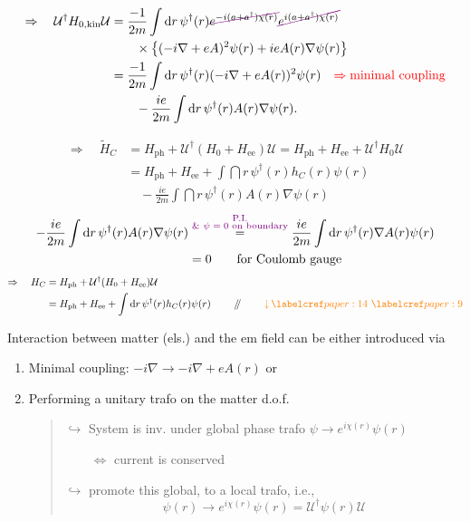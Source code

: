 \begin{align*}
\Rightarrow\quad \mathcal U^\dagger H_{0,\mathrm{kin}}\mathcal U
  &=\frac{-1}{2m}\int \dint r\,\psi^\dagger(r)
       \crossout{e^{-i(a+a^\dagger)\chi(r)}}\crossout{e^{i(a+a^\dagger)\chi(r)}}\\
  &\qquad{}\times
    \bigl\{(-i\nabla+eA)^2\psi(r)+ieA(r)\nabla\psi(r)\bigr\}\\
  &=\frac{-1}{2m}\int \dint r\,\psi^\dagger(r)(-i\nabla+eA(r))^2\psi(r)
      \quad \textcolor{red}{\Rightarrow \text{minimal coupling}}\\
  &\qquad{}-\frac{ie}{2m}\int \dint r\,\psi^\dagger(r)A(r)\nabla\psi(r).
\end{align*}

\begin{align*}
\Rightarrow\quad\widetilde H_C
 &=H_{\mathrm{ph}}+\mathcal U^\dagger(H_0+H_{\mathrm{ee}})\mathcal U
   =H_{\mathrm{ph}}+H_{\mathrm{ee}}+\mathcal U^\dagger H_0\mathcal U\\
 &=H_{\mathrm{ph}}+H_{\mathrm{ee}}+\int \dint r\,
      \psi^\dagger(r)h_C(r)\psi(r)\\
 &\quad -\frac{ie}{2m}\int \dint r\,\psi^\dagger(r)A(r)\nabla\psi(r)
\end{align*}
\begin{align*}
-\frac{ie}{2m}\int \mathop{}\!\mathrm{d} r\,\psi^\dagger(r)A(r)\nabla\psi(r)
 &\overset{\textcolor{violet}{\substack{\text{P.I.}\\
         \text{\& \(\psi=0\) on boundary}}}}{=}
    \frac{ie}{2m}\int \mathop{}\!\mathrm{d} r\,\psi^\dagger(r)\nabla A(r)\psi(r)\\
 &=0\qquad \text{for Coulomb gauge}
\end{align*}
\begin{align*}
\Rightarrow\quad H_C
 &=H_{\mathrm{ph}}+\mathcal U^\dagger(H_0+H_{\mathrm{ee}})\mathcal U\\
 &=H_{\mathrm{ph}}+H_{\mathrm{ee}}+\int \dint r\,\psi^\dagger(r)h_C(r)\psi(r)
 \qquad\done\qquad\textcolor{orange}{\downarrow}\,
   \paperref{paper:14}\ \paperref{paper:9}
\end{align*}

 Interaction between matter (els.) and the em field
can be either introduced via
\begin{enumerate}
\renewcommand{\labelenumi}{\roman{enumi})}
\item Minimal coupling: \(-i\nabla\to-i\nabla+eA(r)\) or
\item Performing a unitary trafo on the matter d.o.f.
\begin{quote}
\(\hookrightarrow\) System is inv. under global phase trafo
\(\psi\to e^{i\chi(r)}\psi(r)\)

\(\qquad\Leftrightarrow\) current is conserved

\(\hookrightarrow\) promote this global, to a local trafo, i.e.,
\[
\psi(r)\to e^{i\chi(r)}\psi(r)=\mathcal U^\dagger\psi(r)\mathcal U
\]
\end{quote}
\end{enumerate}

